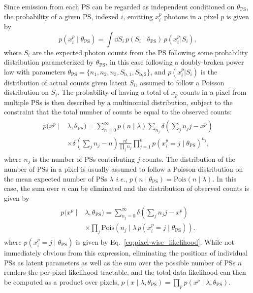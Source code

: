 \documentclass[prd,aps,10pt,nofootinbib,twocolumn,superscriptaddress,preprintnumbers,balancelastpage,longbibliography]{revtex4-1}
\begin{document}
Since emission from each PS can be regarded as independent conditioned on $\theta_\mathrm{PS}$, the probability of a given PS, indexed $i$, emitting $x^p_i$ photons in a pixel $p$ is given by
\begin{equation}
\label{eq:pixel-wise_likelihood}
p(x^p_i\mid\theta_\mathrm{PS}) = \int \dd S_i \,p(S_i\mid\theta_\mathrm{PS})\,p(x^p_i|S_i),
\end{equation}
where $S_i$ are the expected photon counts from the PS following some probability distribution parameterized by $\theta_\mathrm{PS}$, in this case following a doubly-broken power law with parameters $\theta_\mathrm{PS} = \{n_1, n_2, n_3, S_\mathrm{b,1}, S_\mathrm{b,2}\}$, and $p(x^p_i|S_i)$ is the distribution of actual counts given latent $S_i$, assumed to follow a Poisson distribution on $S_i$. The probability of having a total of $x_p$ counts in a pixel from multiple PSs is then described by a multinomial distribution, subject to the constraint that the total number of counts be equal to the observed counts:
\small
\begin{align}
\label{eq:pixel-wise_likelihood_multinomial}
\begin{split}
p(x^p\mid&\lambda,\theta_\mathrm{PS}) =  \sum_{n = 0}^{\infty}  p\left(n \mid \lambda\right) \sum_{n_{j}} \delta\left(\sum_j n_{j}j - x^p\right) \\ 
&\times \delta\left(\sum_j n_{j} - n\right) \frac{n!}{\prod_j n_{j} }\prod_{j=1}^{n} p(x^p_i = j\mid\theta_\mathrm{PS})  ^ {n_{j}},
\end{split}
\end{align}
\normalsize
where $n_j$ is the number of PSs contributing $j$ counts. The distribution of the number of PSs in a pixel is usually assumed to follow a Poisson distribution on the mean expected number of PSs $\lambda$ \emph{i.e.}, $p(n\mid\theta_\mathrm{PS}) = \mathrm{Pois}(n\mid\lambda)$. In this case, the sum over $n$ can be eliminated and the distribution of observed counts is given by
\begin{align}
\label{eq:pixel-wise_likelihood_poisson}
\begin{split}
p(x^p\mid&\lambda, \theta_\mathrm{PS}) = \sum_{n_j = 0}^{\infty} \delta\left(\sum_j n_{j}j - x^p\right) \\ & \times \prod_j \mathrm{Pois}\left(n_{j}\mid\lambda \, p(x^p_i = j\mid\theta_\mathrm{PS})\right).
\end{split}
\end{align}
where $p(x^p_i = j\mid\theta_\mathrm{PS})$ is given by Eq.~\eqref{eq:pixel-wise_likelihood}. 
While not immediately obvious from this expression, eliminating the positions of individual PSs as latent parameters as well as the sum over the possible number of PSs $n$ renders the per-pixel likelihood tractable, and the total data likelihood can then be computed as a product over pixels, $p(x\mid\lambda,\theta_\mathrm{PS}) = \prod_{p} p(x^p\mid\lambda,\theta_\mathrm{PS})$.
\end{document}
